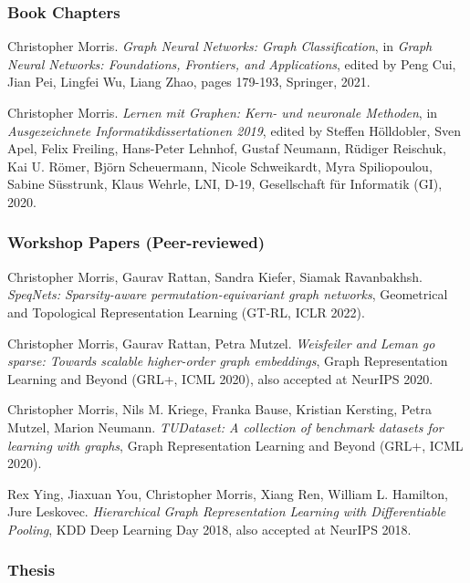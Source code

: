 \documentclass[11pt, a4paper, DIV=12]{scrartcl}
\begin{document}
\begin{thebibliography}{5}
\subsubsection*{Book Chapters}

Christopher Morris.
\emph{Graph Neural Networks: Graph Classification},
in \emph{Graph Neural Networks: Foundations, Frontiers, and Applications}, edited by Peng Cui, Jian Pei, Lingfei Wu, Liang Zhao, pages 179-193, Springer, 2021.

Christopher Morris.
\emph{Lernen mit Graphen: Kern- und neuronale Methoden}, in 
\emph{Ausgezeichnete Informatikdissertationen 2019}, edited by Steffen H{\"o}lldobler, Sven Apel, Felix Freiling, Hans-Peter Lehnhof, Gustaf Neumann, R{\"u}diger Reischuk, Kai U. R{\"o}mer, Bj{\"o}rn Scheuermann, Nicole Schweikardt, Myra Spiliopoulou, Sabine S{\"u}sstrunk, Klaus Wehrle, LNI, D-19, Gesellschaft f{\"u}r Informatik (GI), 2020. 

\subsubsection*{Workshop Papers (Peer-reviewed)}

Christopher Morris, Gaurav Rattan, Sandra Kiefer, Siamak Ravanbakhsh.
\emph{SpeqNets: Sparsity-aware permutation-equivariant graph networks},
Geometrical and Topological Representation Learning (GT-RL, ICLR 2022).

Christopher Morris, Gaurav Rattan, Petra Mutzel.
\emph{Weisfeiler and Leman go sparse: Towards scalable higher-order graph embeddings},
Graph Representation Learning and Beyond (GRL+, ICML 2020), also accepted at NeurIPS 2020.

Christopher Morris, Nils M. Kriege, Franka Bause, Kristian Kersting, Petra Mutzel, Marion Neumann.
\emph{TUDataset: A collection of benchmark datasets for learning with graphs},
Graph Representation Learning and Beyond (GRL+, ICML 2020).

Rex Ying, Jiaxuan You, Christopher Morris, Xiang Ren, William L. Hamilton, Jure Leskovec.
\emph{Hierarchical Graph Representation Learning with Differentiable Pooling},
KDD Deep Learning Day 2018, also accepted at NeurIPS 2018.

\subsubsection*{Thesis}


\end{thebibliography}
\end{document}

